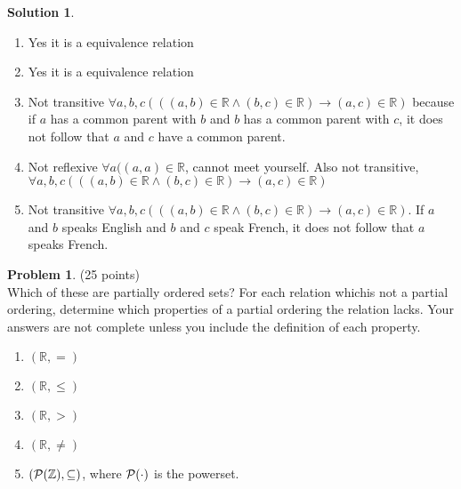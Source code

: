 \documentclass{article}
\theoremstyle{definition}
\newtheorem{problem}{Problem}
\newtheorem*{solution}{Solution}
\begin{document}
\begin{solution}\ \\
\begin{enumerate}
  \item Yes it is a equivalence relation
  \item Yes it is a equivalence relation
  \item Not transitive $\forall a,b,c (((a,b) \in \mathbb{R} \wedge (b,c) \in \mathbb{R}) \rightarrow (a,c) \in \mathbb{R})$ because if $a$ has a common parent with $b$ and $b$ has a common parent with $c$, it does not follow that $a$ and $c$ have a common parent.
  \item Not reflexive $\forall a((a,a) \in \mathbb{R}$, cannot meet yourself. Also not transitive, $\forall a,b,c (((a,b) \in \mathbb{R} \wedge (b,c) \in \mathbb{R}) \rightarrow (a,c) \in \mathbb{R})$ 
\item Not transitive $\forall a,b,c (((a,b) \in \mathbb{R} \wedge (b,c) \in \mathbb{R}) \rightarrow (a,c) \in \mathbb{R})$. If $a$ and $b$ speaks English and $b$ and $c$ speak French, it does not follow that $a$ speaks French.
\end{enumerate}
\end{solution}

\newpage

\begin{problem} (25 points)\\
Which of these are partially ordered sets?  For each relation whichis not a partial ordering, determine which properties of a partial ordering the relation lacks. Your answers are not complete unless you include the definition of each property.
\begin{enumerate}
\item $(\mathbb{R},=)$
\item $(\mathbb{R},\leq)$
\item $(\mathbb{R},>)$
\item $(\mathbb{R},\neq)$
\item $(\cal{P}(\mathbb{Z}),\subseteq)$, where $\cal{P}(\cdot)$ is the powerset.
\end{enumerate}
\end{problem}
\end{document}
